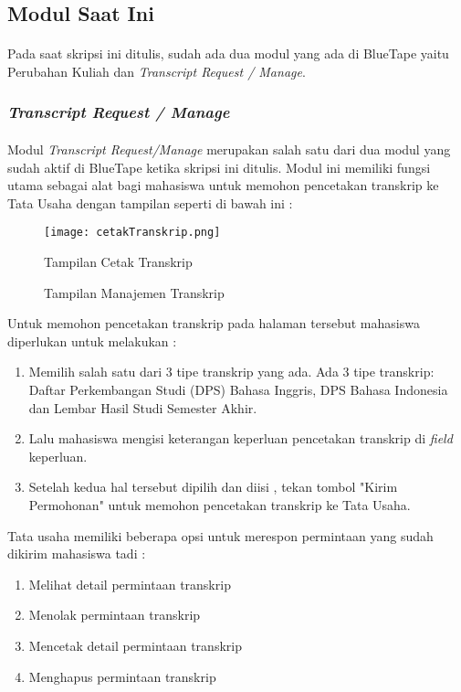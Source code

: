 \subsection{Modul Saat Ini}
\paragraph{} Pada saat skripsi ini ditulis, sudah ada dua modul yang ada di BlueTape yaitu Perubahan Kuliah dan \textit{Transcript Request / Manage}. 
\subsubsection{\textit{Transcript Request / Manage}}
\paragraph{} Modul \textit{Transcript Request/Manage} merupakan salah satu dari dua modul yang sudah aktif di BlueTape ketika skripsi ini ditulis. Modul ini memiliki fungsi utama sebagai alat bagi mahasiswa untuk memohon pencetakan transkrip ke Tata Usaha dengan tampilan seperti di bawah ini :
\begin{figure} [H]
	\centering  
	\texttt{[image: cetakTranskrip.png]}
	\caption[Tampilan Cetak Transkrip]{Tampilan Cetak Transkrip} 
	\label{fig:flow-chart-CodeIgniter} 
\end{figure}
\begin{figure} [H]
	\centering  
	\caption[Tampilan Manajemen Transkrip]{Tampilan Manajemen Transkrip} 
	\label{fig:flow-chart-CodeIgniter} 
\end{figure}
Untuk memohon pencetakan transkrip pada halaman tersebut mahasiswa diperlukan untuk melakukan :
\begin{enumerate}
  \item Memilih salah satu dari 3 tipe transkrip yang ada. Ada 3 tipe transkrip: Daftar Perkembangan Studi (DPS) Bahasa Inggris, DPS Bahasa Indonesia dan Lembar Hasil Studi Semester Akhir.
  \item Lalu mahasiswa mengisi keterangan keperluan pencetakan transkrip di \textit{field} keperluan.
  \item Setelah kedua hal tersebut dipilih dan diisi , tekan tombol "Kirim Permohonan" untuk memohon pencetakan transkrip ke Tata Usaha.
\end{enumerate}
Tata usaha memiliki beberapa opsi untuk merespon permintaan yang sudah dikirim mahasiswa tadi :
\begin{enumerate}
	\item Melihat detail permintaan transkrip
	\item Menolak permintaan transkrip
	\item Mencetak detail permintaan transkrip
	\item Menghapus permintaan transkrip
\end{enumerate}

